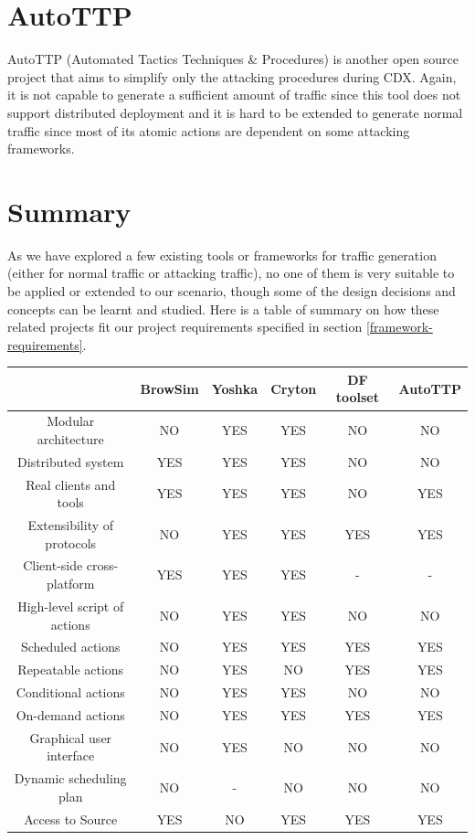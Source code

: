 \documentclass[12pt]{report}
\begin{document}
\section{AutoTTP}
AutoTTP (Automated Tactics Techniques \& Procedures) \citep{AutoTTP} is another open source project that aims to simplify only the attacking procedures during CDX. Again, it is not capable to generate a sufficient amount of traffic since this tool does not support distributed deployment and it is hard to be extended to generate normal traffic since most of its atomic actions are dependent on some attacking frameworks.\\

\section{Summary}
As we have explored a few existing tools or frameworks for traffic generation (either for normal traffic or attacking traffic), no one of them is very suitable to be applied or extended to our scenario, though some of the design decisions and concepts can be learnt and studied. Here is a table of summary on how these related projects fit our project requirements specified in section \ref{framework-requirements}.\\

\setlength{\parindent}{20pt}
\begin{tabular}{ | c | c | c | c | c | c |}
\hline
                     & BrowSim & Yoshka & Cryton & DF toolset & AutoTTP\\
\hline
Modular architecture & NO & YES & YES & NO & NO \\
\hline
Distributed system & YES & YES & YES & NO & NO \\
\hline
Real clients and tools & YES & YES & YES & NO & YES \\
\hline
Extensibility of protocols & NO & YES & YES & YES & YES \\
\hline
Client-side cross-platform & YES & YES & YES & - & - \\
\hline
High-level script of actions & NO & YES & YES & NO & NO \\
\hline
Scheduled actions & NO & YES & YES & YES & YES \\
\hline
Repeatable actions & NO & YES & NO & YES & YES \\
\hline
Conditional actions & NO & YES & YES & NO & NO \\
\hline
On-demand actions & NO & YES & YES & YES & YES \\
\hline
Graphical user interface & NO & YES & NO & NO & NO \\
\hline
Dynamic scheduling plan & NO & - & NO & NO & NO \\
\hline
Access to Source & YES & NO & YES & YES & YES \\
\hline

\end{tabular}
\end{document}
